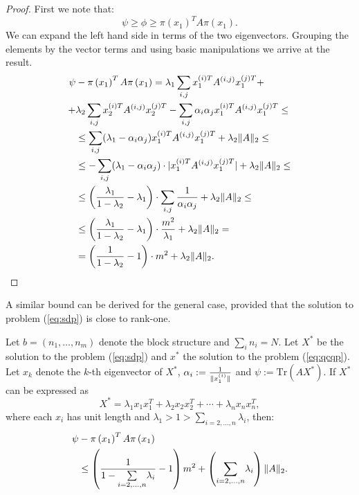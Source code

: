 \begin{proof}
First we note that: $$\psi \geq \phi \geq \pi\left(x_1\right)^T A \pi\left(x_1\right).$$ 
We can expand the left hand side in terms of the two eigenvectors. Grouping the 
elements by the vector terms and using basic manipulations we arrive at the result.
\begin{align*}
\psi &- \pi\left(x_1\right)^T A \pi\left(x_1\right) = \lambda_1 \sum_{i,j} x_1^{(i)T} A^{(i,j)} x_1^{(j)T}  + \\
+ &\lambda_2\sum_{i,j} x_2^{(i)T} A^{(i,j)} x_2^{(j)T} - \sum_{i,j} \alpha_i \alpha_j x_1^{(i)T} A^{(i,j)} x_1^{(j)T}  \leq \\
&\leq  \sum_{i,j} (\lambda_1 - \alpha_i \alpha_j) x_1^{(i)T} A^{(i,j)} x_1^{(j)T}  + \lambda_2 \lVert A\rVert_2 \leq\\
&\leq -\sum_{i,j} (\lambda_1 - \alpha_i \alpha_j)\cdot |x_1^{(i)T} A^{(i,j)} x_1^{(j)T}| +  \lambda_2 \lVert A\rVert_2 \leq\\
&\leq \left(\frac{\lambda_1}{1-\lambda_2} - \lambda_1 \right)\cdot \sum_{i,j}  \frac{1}{\alpha_i \alpha_j} +  \lambda_2 \lVert A\rVert_2 \leq\\
&\leq \left(\frac{\lambda_1}{1-\lambda_2} - \lambda_1 \right)\cdot \frac{m^2}{\lambda_1} +  \lambda_2 \lVert A\rVert_2 =\\
&= \left(\frac{1}{1-\lambda_2} - 1 \right)\cdot m^2 +  \lambda_2 \lVert A\rVert_2.
\end{align*}
\end{proof}

A similar bound can be derived for the general case, provided that the solution to problem (\ref{eq:sdp}) is close to rank-one.
\begin{proposition}
Let $b = \left(n_1,\ldots,n_m\right)$ denote the block structure and $ \sum_i n_i = N $.
Let $X^*$ be the solution to the problem (\ref{eq:sdp}) and $x^{*}$ the solution to the problem (\ref{eq:qcqp}).
Let $x_k$ denote the $k$-th eigenvector of $X^*$,
$\alpha_i := \frac{1}{\lVert x_1^{(i)}\rVert}$ and
$\psi := \mathrm{Tr}\left(A X^{*}\right)$.
If $X^*$ can be expressed as
$$X^* = \lambda_1  x_1 x_1^T + \lambda_2 x_2 x_2^T + \cdots + \lambda_n x_n x_n^T,$$
where each $x_i$ has unit length and $\lambda_1 > 1 >  \underset{i=2,\ldots, n}{\sum} \lambda_i$,
 then:
\begin{align*}
\psi &- \pi\left(x_1\right)^T A \pi\left(x_1\right) \\ &\leq  \left(\frac{1}{1- \underset{i=2,\ldots, n}{\sum} \lambda_i} -1\right)  m^2 + \left(\underset{i=2,\ldots, n}{\sum} \lambda_i\right) \lVert A\rVert_2.
\end{align*}
\end{proposition}

